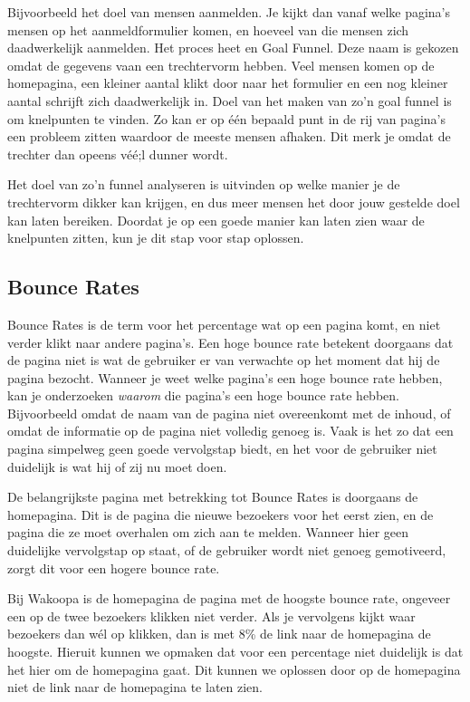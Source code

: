 \documentclass[a4paper, 10pt, pdftex]{report}
\begin{document}
    Bijvoorbeeld het doel van mensen aanmelden. Je kijkt dan vanaf welke pagina's mensen op het aanmeldformulier komen, en hoeveel van die mensen zich daadwerkelijk aanmelden. Het proces heet en Goal Funnel. Deze naam is gekozen omdat de gegevens vaan een trechtervorm hebben. Veel mensen komen op de homepagina, een kleiner aantal klikt door naar het formulier en een nog kleiner aantal schrijft zich daadwerkelijk in. Doel van het maken van zo'n goal funnel is om knelpunten te vinden. Zo kan er op \'e\'en bepaald punt in de rij van pagina's een probleem zitten waardoor de meeste mensen afhaken. Dit merk je omdat de trechter dan opeens v\'e\'e;l dunner wordt.

    Het doel van zo'n funnel analyseren is uitvinden op welke manier je de trechtervorm dikker kan krijgen, en dus meer mensen het door jouw gestelde doel kan laten bereiken. Doordat je op een goede manier kan laten zien waar de knelpunten zitten, kun je dit stap voor stap oplossen.

    \subsection{Bounce Rates}
    Bounce Rates is de term voor het percentage wat op een pagina komt, en niet verder klikt naar andere pagina's. Een hoge bounce rate betekent doorgaans dat de pagina niet is wat de gebruiker er van verwachte op het moment dat hij de pagina bezocht. Wanneer je weet welke pagina's een hoge bounce rate hebben, kan je onderzoeken \emph{waarom} die pagina's een hoge bounce rate hebben. Bijvoorbeeld omdat de naam van de pagina niet overeenkomt met de inhoud, of omdat de informatie op de pagina niet volledig genoeg is. Vaak is het zo dat een pagina simpelweg geen goede vervolgstap biedt, en het voor de gebruiker niet duidelijk is wat hij of zij nu moet doen.

    De belangrijkste pagina met betrekking tot Bounce Rates is doorgaans de homepagina. Dit is de pagina die nieuwe bezoekers voor het eerst zien, en de pagina die ze moet overhalen om zich aan te melden. Wanneer hier geen duidelijke vervolgstap op staat, of de gebruiker wordt niet genoeg gemotiveerd, zorgt dit voor een hogere bounce rate.

    Bij Wakoopa is de homepagina de pagina met de hoogste bounce rate, ongeveer een op de twee bezoekers klikken niet verder. Als je vervolgens kijkt waar bezoekers dan w\'el op klikken, dan is met 8\% de link naar de homepagina de hoogste. Hieruit kunnen we opmaken dat voor een percentage niet duidelijk is dat het hier om de homepagina gaat. Dit kunnen we oplossen door op de homepagina niet de link naar de homepagina te laten zien.
\end{document}
